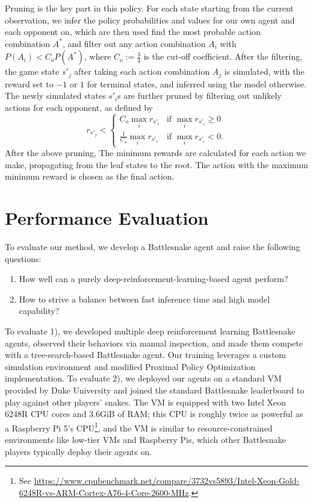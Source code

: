 \documentclass[conference]{IEEEtran}
\newcommand{\todo}[1]{\textcolor{red}{[ #1 ]}}
\renewcommand{\todo}[1]{} %
\begin{document}
Pruning is the key part in this policy.
For each state starting from the current observation,
we infer the policy probabilities and values for our own agent and each opponent
on, which are then used find the most probable action combination $A^\ast$,
and filter out any action combination $A_i$ with $P(A_i)<C_oP(A^\ast)$,
where $C_o:=\frac{3}{4}$ is the cut-off coefficient.
After the filtering,
the game state $s'_j$ after taking each action combination $A_j$ is simulated,
with the reward set to $-1$ or $1$ for terminal states,
and inferred using the model otherwise.
The newly simulated states $s'_i$s are further pruned by filtering out unlikely
actions for each opponent, as defined by
$$
    r_{s'_j} < \begin{cases}
        C_o\max_i r_{s'_i}           & \text{if } \max_i r_{s'_i} \ge 0 \\
        \frac{1}{C_o}\max_i r_{s'_i} & \text{if } \max_i r_{s'_i} < 0.
    \end{cases}
$$
After the above pruning,
The minimum rewards are calculated for each action we make,
propagating from the leaf states to the root.
The action with the maximum minimum reward is chosen as the final action.

\section{Performance Evaluation}\label{sec:eval}

\todo{introduce your method of verifying the validity/correctness of your method}

To evaluate our method, we develop a Battlesnake agent and raise the following questions:
\begin{enumerate}
    \item How well can a purely deep-reinforcement-learning-based agent perform?
    \item How to strive a balance between fast inference time and high model capability?
\end{enumerate}

To evaluate 1),
we developed multiple deep reinforcement learning Battlesnake agents,
observed their behaviors via manual inspection,
and made them compete with a tree-search-based Battlesnake agent.
Our training leverages a custom simulation environment and modified Proximal
Policy Optimization implementation. To evaluate 2),
we deployed our agents on a standard VM provided by Duke University and joined
the standard Battlesnake leaderboard to play against other players' snakes.
The VM is equipped with two Intel Xeon 6248R CPU cores and 3.6GiB of RAM;
this CPU is roughly twice as powerful as a Raspberry Pi 5's CPU\footnote{See
    \url{https://www.cpubenchmark.net/compare/3732vs5893/Intel-Xeon-Gold-6248R-vs-ARM-Cortex-A76-4-Core-2600-MHz}.
},
and the VM is similar to resource-constrained environments like low-tier VMs and
Raspberry Pis, which other Battlesnake players typically deploy their agents on.
\end{document}
